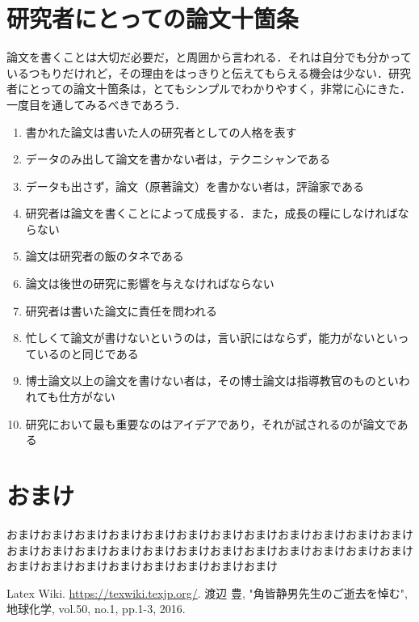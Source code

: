 \documentclass[a4paper,10pt,twocolumn,uplatex]{jsarticle}
\begin{document}
\section{研究者にとっての論文十箇条}
論文を書くことは大切だ必要だ，と周囲から言われる．それは自分でも分かっているつもりだけれど，その理由をはっきりと伝えてもらえる機会は少ない．研究者にとっての論文十箇条\cite{渡辺豊2016}は，とてもシンプルでわかりやすく，非常に心にきた．一度目を通してみるべきであろう．

\begin{enumerate} %
  \item 書かれた論文は書いた人の研究者としての人格を表す
  \item データのみ出して論文を書かない者は，テクニシャンである
  \item データも出さず，論文（原著論文）を書かない者は，評論家である
  \item 研究者は論文を書くことによって成長する．また，成長の糧にしなければならない
  \item 論文は研究者の飯のタネである
  \item 論文は後世の研究に影響を与えなければならない
  \item 研究者は書いた論文に責任を問われる
  \item 忙しくて論文が書けないというのは，言い訳にはならず，能力がないといっているのと同じである
  \item 博士論文以上の論文を書けない者は，その博士論文は指導教官のものといわれても仕方がない
  \item 研究において最も重要なのはアイデアであり，それが試されるのが論文である
\end{enumerate}

\section{おまけ}
おまけおまけおまけおまけおまけおまけおまけおまけおまけおまけおまけおまけおまけおまけおまけおまけおまけおまけおまけおまけおまけおまけおまけおまけおまけおまけおまけおまけおまけおまけおまけおまけ

\footnotesize{
  \begin{thebibliography}{99}
     Latex Wiki. \url{https://texwiki.texjp.org/}.
     渡辺 豊, "角皆静男先生のご逝去を悼む", 地球化学, vol.50, no.1, pp.1-3, 2016.
  \end{thebibliography}
}

% 
% 

\end{document}

